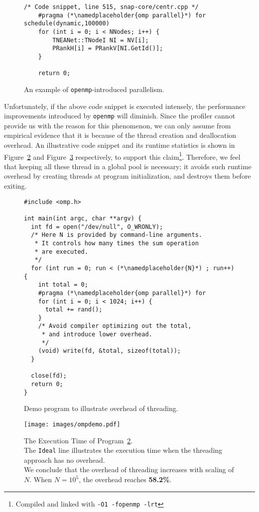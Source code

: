 \begin{figure}[ht]
    \centering
\begin{lstlisting}[frame=tlbr]
    /* Code snippet, line 515, snap-core/centr.cpp */
    #pragma (*\namedplaceholder{omp parallel}*) for schedule(dynamic,100000)
    for (int i = 0; i < NNodes; i++) {
        TNEANet::TNodeI NI = NV[i];
        PRankH[i] = PRankV[NI.GetId()];
    }

    return 0;
\end{lstlisting}
    \caption{An example of \texttt{openmp}-introduced parallelism.}
    \label{code:openmp}
\end{figure}

\par Unfortunately, if the above code snippet is executed intensely, the 
performance improvements introduced by \texttt{openmp} will diminish. Since 
the profiler cannot provide us with the reason for this phenomenon, we can
only assume from empirical evidence that it is because of the thread creation 
and deallocation overhead. An illustrative code snippet and its runtime
statistics is shown in Figure~\ref{code:ompdemo} and Figure~\ref{fig:ompdemo} respectively,
to support this claim\footnote{Compiled and linked with \texttt{-O1 -fopenmp -lrt}}.
Therefore, we feel that keeping all these thread in a global pool is necessary;
it avoids such runtime overhead by creating threads at program initialization,
and destroys them before exiting.

\begin{figure}[ht]
    \centering
\begin{lstlisting}[frame=tlbr]
#include <omp.h>

int main(int argc, char **argv) {
  int fd = open("/dev/null", O_WRONLY);
  /* Here N is provided by command-line arguments. 
   * It controls how many times the sum operation
   * are executed.
   */
  for (int run = 0; run < (*\namedplaceholder{N}*) ; run++) {
    int total = 0;
    #pragma (*\namedplaceholder{omp parallel}*) for
    for (int i = 0; i < 1024; i++) {
      total += rand();
    }
    /* Avoid compiler optimizing out the total,
     * and introduce lower overhead.
     */
    (void) write(fd, &total, sizeof(total));
  }

  close(fd);
  return 0;
}
\end{lstlisting}
    \caption{Demo program to illustrate overhead of threading.}
    \label{code:ompdemo}
\end{figure}

\begin{figure}[ht]
    \centering
    \texttt{[image: images/ompdemo.pdf]}
    \caption{The Execution Time of Program~\ref{code:ompdemo}. \\
        The \texttt{Ideal} line illustrates the execution time when the threading
        approach has no overhead. \\
        We conclude that the overhead of threading increases with scaling of $N$.
        When $N = 10^5$, the overhead reaches \textbf{58.2\%}. }
    \label{fig:ompdemo}
\end{figure}

